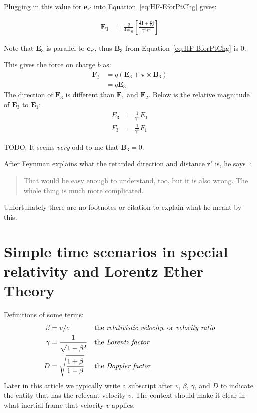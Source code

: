 \documentclass[a4paper]{article}
\theoremstyle{plain}
\theoremstyle{definition}
\newcommand{\ihat}{\mathbf{i}}
\newcommand{\jhat}{\mathbf{j}}
\newcommand{\vect}[1]{\mathbf{#1}}
\begin{document}
Plugging in this value for $\vect{e}_{r'}$ into
Equation~\eqref{eq:HF-EforPtChg} gives:

\begin{align*}
\vect{E}_3 & = \frac{q}{4 \pi \epsilon_0}
             \left[
               \frac{\frac{1}{\gamma} \ihat + \frac{v}{c} \jhat}{\gamma^2 r^2}
             \right]
\end{align*}

Note that $\vect{E}_3$ is parallel to $\vect{e}_{r'}$, thus
$\vect{B}_3$ from Equation~\eqref{eq:HF-BforPtChg} is 0.

This gives the force on charge $b$ as:
\begin{align*}
\vect{F}_3
  & = q (\vect{E}_3 + \vect{v} \times \vect{B}_3) \\
  & = q \vect{E}_3
\end{align*}
The direction of $\vect{F}_3$ is different than $\vect{F}_1$ and $\vect{F}_2$.
Below is the relative magnitude of $\vect{E}_3$ to $\vect{E}_1$:
\begin{align*}
E_3 & = \frac{1}{\gamma^2} E_1 \\
F_3 & = \frac{1}{\gamma^2} F_1
\end{align*}

TODO: It seems {\em very} odd to me that $\vect{B}_3 = 0$.

After Feynman explains what the retarded direction and distance
$\vect{r'}$ is, he says~\cite{FeynmanLecturesVolICh28}:
\begin{quote}
That would be easy enough to understand, too, but it is also
wrong.  The whole thing is much more complicated.
\end{quote}
Unfortunately there are no footnotes or citation to explain what he
meant by this.


\section{Simple time scenarios in special relativity and Lorentz Ether Theory}
\label{sec:simple-sr-time}

Definitions of some terms:
\begin{align}
  \beta & = v / c \label{defn:betaB} & & \text{the {\em relativistic velocity}, or {\em velocity ratio}} \\
  \gamma & = \frac{1}{\sqrt{1 - \beta^2}} & & \text{the {\em Lorentz factor}} \label{defn:LorentzFactor} \\
  D & = \sqrt{ \frac{1 + \beta}{1 - \beta} } & & \text{the {\em Doppler factor}} \label{defn:DopplerFactor}
\end{align}
Later in this article we typically write a subscript after $v$,
$\beta$, $\gamma$, and $D$ to indicate the entity that has the
relevant velocity $v$.  The context should make it clear in what
inertial frame that velocity $v$ applies.
\end{document}
